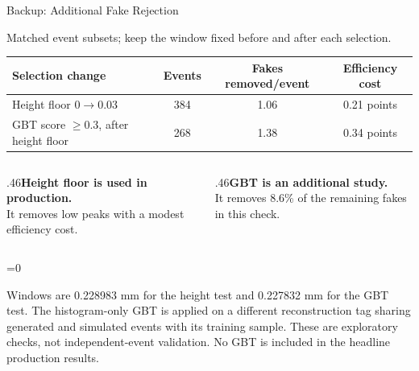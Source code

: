 \documentclass[xcolor=table,aspectratio=169]{beamer}
\providecommand{\talkbuild}{0}
\newcommand{\readingonly}[1]{\ifnum\talkbuild=0\relax#1\fi}
\newcommand{\readingnote}[1]{\readingonly{\par\vspace{.35em}%
  {\footnotesize\color{black!65}#1\par}}}
\newcommand{\context}[1]{{\centering\footnotesize\color{black!55}#1\par}\vspace{.65em}}
\begin{document}
\begin{frame}{Backup: Additional Fake Rejection}
\relax

\context{Matched event subsets; keep the window fixed before and after each selection.}
\centering\small
\begin{tabular}{lccc}\toprule
Selection change & Events & Fakes removed/event & Efficiency cost\\\midrule
Height floor $0\to0.03$ & 384 & 1.06 & 0.21 points\\
GBT score $\geq0.3$, after height floor & 268 & 1.38 & 0.34 points\\\bottomrule
\end{tabular}
\par\vspace{1.2em}
\begin{columns}[t]
\begin{column}{.46\linewidth}\small\textbf{Height floor is used in production.}\\[.5em]
It removes low peaks with a modest efficiency cost.
\end{column}
\begin{column}{.46\linewidth}\small\textbf{GBT is an additional study.}\\[.5em]
It removes 8.6\% of the remaining fakes in this check.
\end{column}\end{columns}
\readingnote{Windows are 0.228983 mm for the height test and 0.227832 mm for the GBT test. The histogram-only GBT is applied on a different reconstruction tag sharing generated and simulated events with its training sample. These are exploratory checks, not independent-event validation. No GBT is included in the headline production results.}
\end{frame}
\end{document}
